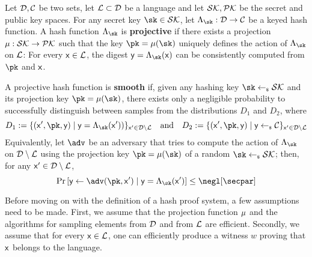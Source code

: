 \begin{definition}
	Let $\mathcal{D},\mathcal{C}$ be two sets, let $\mathcal{L} \subset \mathcal{D}$ be a language and let $\mathcal{SK},\mathcal{PK}$ be the secret and public key spaces.
	For any secret key $\sk \in \SKSpace$, let $\Lambda_{\sk} : \Domain \rightarrow \Codomain$ be a keyed hash function.
	A hash function $\Lambda_{\sk}$ is \textbf{projective} if there exists a projection $\mu : \mathcal{SK} \rightarrow \mathcal{PK}$ such that the key $\pk = \projectKey(\sk)$ uniquely defines the action of $\Lambda_\sk$ on $\mathcal{L}$: For every ${\mathsf{x}} \in \mathcal{L}$, the digest $\y = \Lambda_\sk(\x)$ can be consistently computed from $\pk$ and ${\mathsf{x}}$.
	
	A projective hash function is \textbf{smooth} if, given any hashing key $\sk \getsr \SKSpace$ and its projection key $\pk = \projectKey(\sk)$, there exists only a negligible probability to successfully distinguish between samples from the distributions $D_1$ and $D_2$, where
	\[ D_1 := \{ (\x', \pk, \y) \mid \y = \Lambda_\sk(\x')) \}_{\x' \in \Domain\setminus\Language} \quad \text{and} \quad D_2 := \{(\x', \pk, \y) \mid \y \getsr \Codomain \}_{\x' \in \Domain\setminus\Language}\]
	Equivalently, let $\adv$ be an adversary that tries to compute the action of $\HPSHash_\sk$ on $\mathcal{D} \setminus \mathcal{L}$ using the projection key $\pk = \projectKey(\sk)$ of a random $\sk \getsr \SKSpace$; then, for any ${\mathsf{x}}' \in \mathcal{D} \setminus \mathcal{L}$,
	\[ \Pr \left[ \y \gets \adv(\pk,\x')  \mid \y = \HPSHash_\sk(\x') \right] \leq \negl[\secpar]\]
\end{definition}

Before moving on with the definition of a hash proof system, a few assumptions need to be made.
First, we assume that the projection function $\mu$ and the algorithms for sampling elements from $\mathcal{D}$ and from $\mathcal{L}$ are efficient.
Secondly, we assume that for every ${\mathsf{x}} \in \mathcal{L}$, one can efficiently produce a witness $w$ proving that ${\mathsf{x}}$ belongs to the language.

